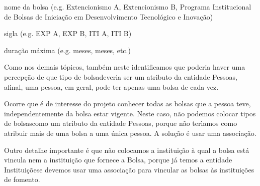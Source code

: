 \documentclass[
12pt,		%
openright,	%
twoside,  %
a4paper,			%
chapter=TITLE,		%
english,			%
french,				%
spanish,			%
brazil				%
]{USPSC-classe/USPSC}
\begin{document}
\begin{alineas}
\item nome da bolsa (e.g. \textquotedbl Extencionismo A\textquotedbl , \textquotedbl Extencionismo B\textquotedbl , \textquotedbl Programa Institucional de Bolsas de Inicia\c{c}\~ao em Desenvolvimento Tecnol\'ogico e Inova\c{c}\~ao\textquotedbl )
\item sigla (e.g. EXP A, EXP B, ITI A, ITI B)
\item dura\c{c}\~ao m\'axima (e.g.  meses\textquotedbl ,  meses\textquotedbl , etc.)
\end{alineas}

Como nos demais t\'opicos, tamb\'em neste identificamos que poderia haver uma percep\c{c}\~ao de que \textquotedbl tipo de bolsa\textquotedbl  deveria ser um atributo da entidade \textquotedbl Pessoas\textquotedbl , afinal, uma pessoa, em geral, pode ter apenas uma bolsa de cada vez.














Ocorre que \'e de interesse do projeto conhecer todas as bolsas que a pessoa teve, independentemente da bolsa estar vigente. Neste caso, n\~ao podemos colocar \textquotedbl tipos de bolsas\textquotedbl  como um atributo da entidade \textquotedbl Pessoas\textquotedbl , porque n\~ao ter\'{\i}amos como atribuir mais de uma bolsa a uma \'unica pessoa. A solu\c{c}\~ao \'e usar uma associa\c{c}\~ao.














Outro detalhe importante \'e que n\~ao colocamos a institui\c{c}\~ao \`a qual a bolsa est\'a vincula nem a institui\c{c}\~ao que fornece a Bolsa, porque j\'a temos a entidade \textquotedbl Institui\c{c}\~oes\textquotedbl  e devemos usar uma associa\c{c}\~ao para vincular as bolsas \`as institui\c{c}\~oes de fomento.
\end{document}
